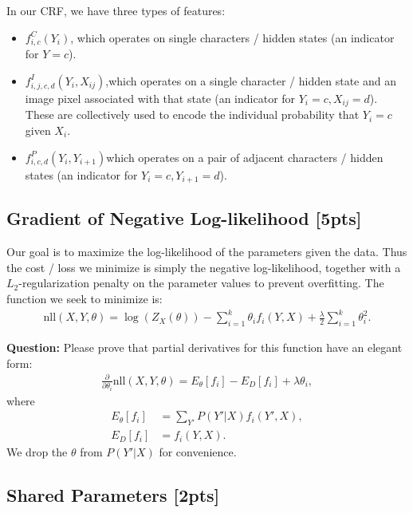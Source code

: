 In our CRF, we have three types of features:
\begin{itemize}
	\item $f_{i,c}^C ( Y_i )$, which operates on single characters / hidden states (an indicator for $Y = c$).
	
	\item $f_{i,j,c,d}^I ( Y_i, X_{ij})$,which operates on a single character / hidden state and an image pixel	associated with that state (an indicator for $Y_i = c, X_{ij} = d$). These are collectively used to encode the individual probability that $Y_i = c$ given $X_i$.
	
	
	\item $f_{i,c,d}^P (Y_i, Y_{i+1})$which operates on a pair of adjacent characters / hidden states (an indicator for $Y_i = c, Y_{i+1}  = d$).
	
\end{itemize}


\subsection{Gradient of Negative Log-likelihood  [5pts]}

Our goal is to maximize the log-likelihood of the parameters given the data. Thus the cost / loss we minimize is simply the negative log-likelihood, together with a $L_2$-regularization penalty on the parameter values to prevent overfitting. The function we seek to minimize is:
\begin{align}
\text{nll} (X, Y, \theta) = \log(Z_X(\theta))  - \sum_{i =1}^{k} \theta_i f_i (Y, X) + \frac{\lambda}{2} \sum_{i = 1}^{k} \theta_i^2.
\end{align}

\textbf{Question: }Please prove that partial derivatives for this function have an elegant form:
\begin{align}
\frac{\partial }{\partial \theta_i} \text{nll} (X, Y, \theta) = E_{\theta} [ f_i ] - E_D [ f_i] + \lambda \theta_i,
\end{align}
where
\begin{align}
E_{\theta} [f_i] &= \sum_{Y'} P( Y' | X) f_i (Y', X), \\
E_D [ f_i ] &= f_i (Y, X).
\end{align}
We drop the $\theta$ from $P(Y' | X)$ for convenience.


\subsection{Shared Parameters [2pts]}

